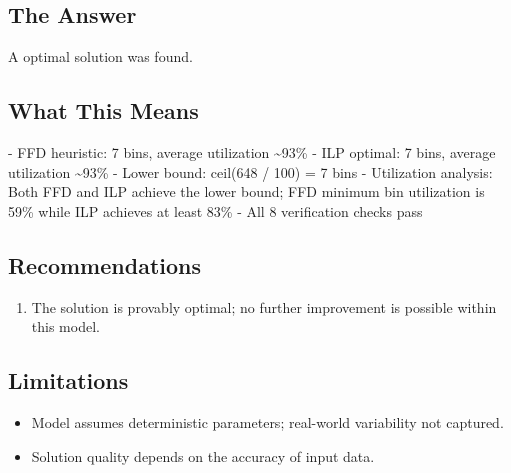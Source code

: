 \documentclass[11pt, a4paper]{article}
\begin{document}
\subsection{The Answer}

\begin{polyainsight}[title={Bottom Line}]
A optimal solution was found.
\end{polyainsight}

\subsection{What This Means}

- FFD heuristic: 7 bins, average utilization \textasciitilde{}93\%
- ILP optimal: 7 bins, average utilization \textasciitilde{}93\%
- Lower bound: ceil(648 / 100) = 7 bins
- Utilization analysis: Both FFD and ILP achieve the lower bound; FFD minimum bin utilization is 59\% while ILP achieves at least 83\%
- All 8 verification checks pass



\subsection{Recommendations}

\begin{enumerate}
  \item The solution is provably optimal; no further improvement is possible within this model.
\end{enumerate}

\subsection{Limitations}

\begin{polyawarnbox}
\begin{itemize}
  \item Model assumes deterministic parameters; real-world variability not captured.
  \item Solution quality depends on the accuracy of input data.
\end{itemize}
\end{polyawarnbox}

\end{document}
